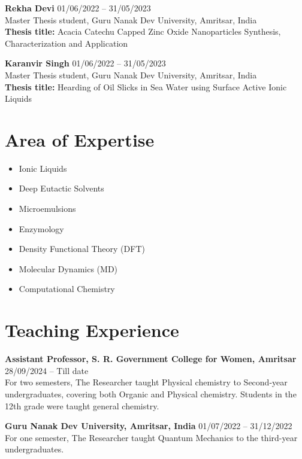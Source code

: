 \documentclass[11pt,a4paper]{article}
\begin{document}
\textbf{Rekha Devi} \hfill 01/06/2022 -- 31/05/2023\\
Master Thesis student, Guru Nanak Dev University, Amritsar, India\\
\textbf{Thesis title:} Acacia Catechu Capped Zinc Oxide Nanoparticles Synthesis, Characterization and Application

\textbf{Karanvir Singh} \hfill 01/06/2022 -- 31/05/2023\\
Master Thesis student, Guru Nanak Dev University, Amritsar, India\\
\textbf{Thesis title:} Hearding of Oil Slicks in Sea Water using Surface Active Ionic Liquids

\vspace{0.6cm}

\section*{Area of Expertise}

\begin{itemize}
	\item Ionic Liquids
	\item Deep Eutactic Solvents
	\item Microemulsions
	\item Enzymology
	\item Density Functional Theory (DFT)
	\item Molecular Dynamics (MD)
	\item Computational Chemistry
\end{itemize}

\vspace{0.6cm}

\section*{Teaching Experience}

\textbf{Assistant Professor, S. R. Government College for Women, Amritsar} \hfill 28/09/2024 -- Till date\\
For two semesters, The Researcher taught Physical chemistry to Second-year undergraduates, covering both Organic and Physical chemistry. Students in the 12th grade were taught general chemistry.

\textbf{Guru Nanak Dev University, Amritsar, India} \hfill 01/07/2022 -- 31/12/2022\\
For one semester, The Researcher taught Quantum Mechanics to the third-year undergraduates.
\end{document}
